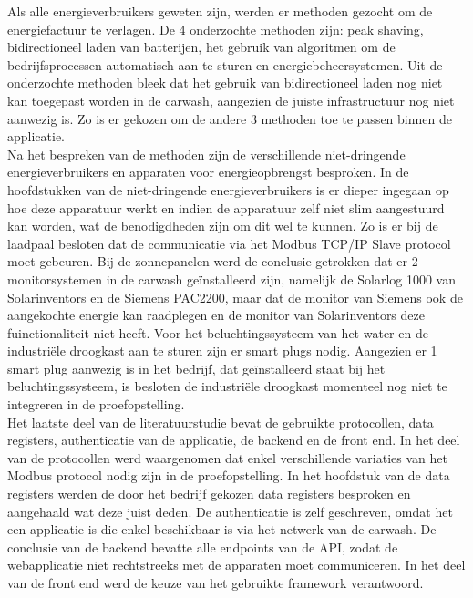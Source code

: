 Als alle energieverbruikers geweten zijn, werden er methoden gezocht om de energiefactuur te verlagen. De 4 onderzochte methoden zijn: peak shaving, bidirectioneel laden van batterijen, het gebruik van algoritmen om de bedrijfsprocessen automatisch aan te sturen en energiebeheersystemen. Uit de onderzochte methoden bleek dat het gebruik van bidirectioneel laden nog niet kan toegepast worden in de carwash, aangezien de juiste infrastructuur nog niet aanwezig is. Zo is er gekozen om de andere 3 methoden toe te passen binnen de applicatie.\\

Na het bespreken van de methoden zijn de verschillende niet-dringende energieverbruikers en apparaten voor energieopbrengst besproken. In de hoofdstukken van de niet-dringende energieverbruikers is er dieper ingegaan op hoe deze apparatuur werkt en indien de apparatuur zelf niet slim aangestuurd kan worden, wat de benodigdheden zijn om dit wel te kunnen. Zo is er bij de laadpaal besloten dat de communicatie via het Modbus TCP/IP Slave protocol moet gebeuren. Bij de zonnepanelen werd de conclusie getrokken dat er 2 monitorsystemen in de carwash geïnstalleerd zijn, namelijk de Solarlog 1000 van Solarinventors en de Siemens PAC2200, maar dat de monitor van Siemens ook de aangekochte energie kan raadplegen en de monitor van Solarinventors deze fuinctionaliteit niet heeft. Voor het beluchtingssysteem van het water en de industriële droogkast aan te sturen zijn er smart plugs nodig. Aangezien er 1 smart plug aanwezig is in het bedrijf, dat geïnstalleerd staat bij het beluchtingssysteem, is besloten de industriële droogkast momenteel nog niet te integreren in de proefopstelling.\\

Het laatste deel van de literatuurstudie bevat de gebruikte protocollen, data registers, authenticatie van de applicatie, de backend en de front end. In het deel van de protocollen werd waargenomen dat enkel verschillende variaties van het Modbus protocol nodig zijn in de proefopstelling. In het hoofdstuk van de data registers werden de door het bedrijf gekozen data registers besproken en aangehaald wat deze juist deden. De authenticatie is zelf geschreven, omdat het een applicatie is die enkel beschikbaar is via het netwerk van de carwash. De conclusie van de backend bevatte alle endpoints van de API, zodat de webapplicatie niet rechtstreeks met de apparaten moet communiceren. In het deel van de front end werd de keuze van het gebruikte framework verantwoord.